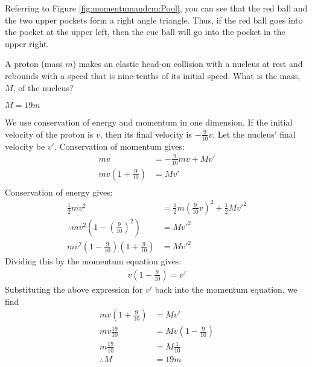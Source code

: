 \begin{solution}
Referring to Figure \ref{fig:momentumandcm:Pool}, you can see that the red ball and the two upper pockets form a right angle triangle. Thus, if the red ball goes into the pocket at the upper left, then the cue ball will go into the pocket in the upper right.


\end{solution}


\question A proton (mass $m$) makes an elastic head-on collision with a nucleus at rest and rebounds with a speed that is nine-tenths of its initial speed. What is the mass, $M$, of the nucleus?

\begin{finalanswer}
$M=19m$
\end{finalanswer}
\begin{solution}
We use conservation of energy and momentum in one dimension. If the initial velocity of the proton is $v$, then its final velocity is $-\frac{9}{10}v$. Let the nucleus' final velocity be $v'$. Conservation of momentum gives:
\begin{align*}
mv &= -\frac{9}{10}mv + Mv'\\
mv \left(1+\frac{9}{10}\right)&=Mv'\\
\end{align*}
Conservation of energy gives:
\begin{align*}
\frac{1}{2}mv^2&= \frac{1}{2}m\left(\frac{9}{10}v\right)^2 + \frac{1}{2}Mv'^2\\
\therefore mv^2(1-\left(\frac{9}{10}\right)^2)&=Mv'^2\\
mv^2\left(1-\frac{9}{10}\right)\left(1+\frac{9}{10}\right)&=Mv'^2
\end{align*}
Dividing this by the momentum equation gives:
\begin{align*}
v\left(1-\frac{9}{10}\right)=v'
\end{align*}
Substituting the above expression for $v'$ back into the momentum equation, we find
\begin{align*}
mv \left(1+\frac{9}{10}\right)&=Mv'\\
mv \frac{19}{10}&=Mv\left(1-\frac{9}{10}\right)\\
m \frac{19}{10}&=M\frac{1}{10}\\
\therefore M&=19m
\end{align*}
\end{solution}


